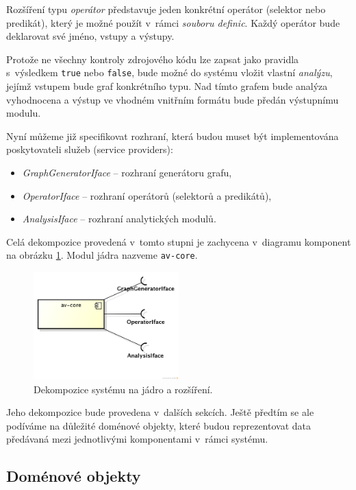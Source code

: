 Rozšíření typu \emph{operátor} představuje jeden konkrétní operátor (selektor nebo predikát), který je možné použít v~rámci \emph{souboru definic}. Každý operátor bude deklarovat své jméno, vstupy a výstupy.

Protože ne všechny kontroly zdrojového kódu lze zapsat jako pravidla s~výsledkem \verb+true+ nebo \verb+false+, bude možné do systému vložit vlastní \emph{analýzu}, jejímž vstupem bude graf konkrétního typu. Nad tímto grafem bude analýza vyhodnocena a výstup ve vhodném vnitřním formátu bude předán výstupnímu modulu.

Nyní můžeme již specifikovat rozhraní, která budou muset být implementována poskytovateli služeb (service providers):

\begin{itemize}
\item \emph{GraphGeneratorIface} -- rozhraní generátoru grafu,
\item \emph{OperatorIface} -- rozhraní operátorů (selektorů a predikátů),
\item \emph{AnalysisIface} -- rozhraní analytických modulů.
\end{itemize}

Celá dekompozice provedená v~tomto stupni je zachycena v~diagramu komponent na obrázku \ref{design-modules}. Modul jádra nazveme \verb+av-core+.
\begin{figure}[h!]
  \centering
  \includegraphics[width=0.5\textwidth]{./uml/archval_module_cmp.png}
  \caption{Dekompozice systému na jádro a rozšíření.\label{design-modules}}
\end{figure}
Jeho dekompozice bude provedena v~dalších sekcích. Ještě předtím se ale podíváme na důležité doménové objekty, které budou reprezentovat data předávaná mezi jednotlivými komponentami v~rámci systému.

\subsection{Doménové objekty}
\label{design-domain_objects}

